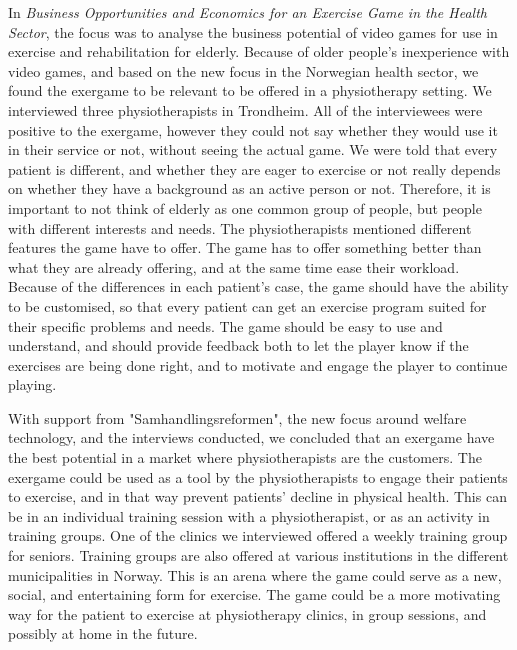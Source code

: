 In \emph{Business Opportunities and Economics for an Exercise Game in the Health Sector}, the focus was to analyse the business potential of video games for use in exercise and rehabilitation for elderly.  Because of older people's inexperience with video games, and based on the new focus in the Norwegian health sector, we found the exergame to be relevant to be offered in a physiotherapy setting. We interviewed three physiotherapists in Trondheim. All of the interviewees were positive to the exergame, however they could not say whether they would use it in their service or not, without seeing the actual game. We were told that every patient is different, and whether they are eager to exercise or not really depends on whether they have a background as an active person or not. Therefore, it is important to not think of elderly as one common group of people, but people with different interests and needs. The physiotherapists mentioned different features the game have to offer. The game has to offer something better than what they are already offering, and at the same time ease their workload. Because of the differences in each patient's case, the game should have the ability to be customised, so that every patient can get an exercise program suited for their specific problems and needs. The game should be easy to use and understand, and should provide feedback both to let the player know if the exercises are being done right, and to motivate and engage the player to continue playing. 

With support from "Samhandlingsreformen", the new focus around welfare technology, and the interviews conducted, we concluded that an exergame have the best potential in a market where physiotherapists are the customers. The exergame could be used as a tool by the physiotherapists to engage their patients to exercise, and in that way prevent patients' decline in physical health. This can be in an individual training session with a physiotherapist, or as an activity in training groups. One of the clinics we interviewed offered a weekly training group for seniors. Training groups are also offered at various institutions in the different municipalities in Norway. This is an arena where the game could serve as a new, social, and entertaining form for exercise. The game could be a more motivating way for the patient to exercise at physiotherapy clinics, in group sessions, and possibly at home in the future. 

